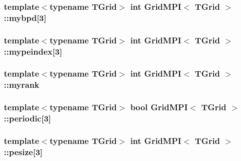 \subsubsection[{mybpd}]{\setlength{\rightskip}{0pt plus 5cm}template$<$typename T\+Grid$>$ int {\bf Grid\+M\+P\+I}$<$ T\+Grid $>$\+::mybpd\mbox{[}3\mbox{]}\hspace{0.3cm}{\ttfamily [protected]}}\label{class_grid_m_p_i_a18238a13a4e9d9448ff9562560d5eadf}
\hypertarget{class_grid_m_p_i_a18aa2c80d121cc50339949d8c3d0d547}{}
\subsubsection[{mypeindex}]{\setlength{\rightskip}{0pt plus 5cm}template$<$typename T\+Grid$>$ int {\bf Grid\+M\+P\+I}$<$ T\+Grid $>$\+::mypeindex\mbox{[}3\mbox{]}\hspace{0.3cm}{\ttfamily [protected]}}\label{class_grid_m_p_i_a18aa2c80d121cc50339949d8c3d0d547}
\hypertarget{class_grid_m_p_i_ac06426dbf8b56ab9f642f38b99a8ff58}{}
\subsubsection[{myrank}]{\setlength{\rightskip}{0pt plus 5cm}template$<$typename T\+Grid$>$ int {\bf Grid\+M\+P\+I}$<$ T\+Grid $>$\+::myrank\hspace{0.3cm}{\ttfamily [protected]}}\label{class_grid_m_p_i_ac06426dbf8b56ab9f642f38b99a8ff58}
\hypertarget{class_grid_m_p_i_a5376cf349ce2d317bddc363907b22f69}{}
\subsubsection[{periodic}]{\setlength{\rightskip}{0pt plus 5cm}template$<$typename T\+Grid$>$ bool {\bf Grid\+M\+P\+I}$<$ T\+Grid $>$\+::periodic\mbox{[}3\mbox{]}\hspace{0.3cm}{\ttfamily [protected]}}\label{class_grid_m_p_i_a5376cf349ce2d317bddc363907b22f69}
\hypertarget{class_grid_m_p_i_ad23be40f0e498f46f215c36e0a00546c}{}
\subsubsection[{pesize}]{\setlength{\rightskip}{0pt plus 5cm}template$<$typename T\+Grid$>$ int {\bf Grid\+M\+P\+I}$<$ T\+Grid $>$\+::pesize\mbox{[}3\mbox{]}\hspace{0.3cm}{\ttfamily [protected]}}\label{class_grid_m_p_i_ad23be40f0e498f46f215c36e0a00546c}
\hypertarget{class_grid_m_p_i_a2630fe6ea5a92bc46e122bce621143e5}{}
